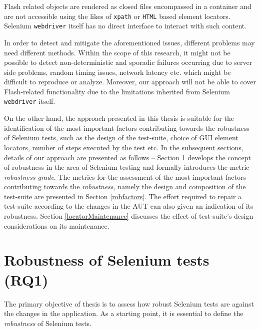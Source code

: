 Flash related objects are rendered as closed files encompassed in a container and are not accessible using the likes of \texttt{xpath} or \texttt{HTML} based element locators. Selenium \texttt{webdriver} itself has no direct interface to interact with such content. 

In order to detect and mitigate the aforementioned issues, different problems may need different methods. Within the scope of this research, it might not be possible to detect non-deterministic and sporadic failures occurring due to server side problems, random timing issues, network latency etc. which might be difficult to reproduce or analyze. Moreover, our approach will not be able to cover Flash-related functionality due to the limitations inherited from Selenium \texttt{webdriver} itself.

On the other hand, the approach presented in this thesis is suitable for the identification of the most important factors contributing towards the robustness of Selenium tests, such as the design of the test-suite, choice of GUI element locators, number of steps executed by the test etc. In the subsequent sections, details of our approach are presented as follows -- Section \ref{robustnessOfSeleniumTests} develops the concept of robustness in the area of Selenium testing and formally introduces the metric \textit{robustness grade}. The metrics for the assessment of the most important factors contributing towards the \textit{robustness}, namely the design and composition of the test-suite are presented in Section \ref{robfactors}. The effort required to repair a test-suite according to the changes in the AUT can also given an indication of its robustness. Section \ref{locatorMaintenance} discusses the effect of test-suite's design considerations on its maintenance. 

\section{Robustness of Selenium tests (RQ1)}
\label{robustnessOfSeleniumTests}

The primary objective of thesis is to assess how robust Selenium tests are against the changes in the application. As a starting point, it is essential to define the \textit{robustness} of Selenium tests. 


